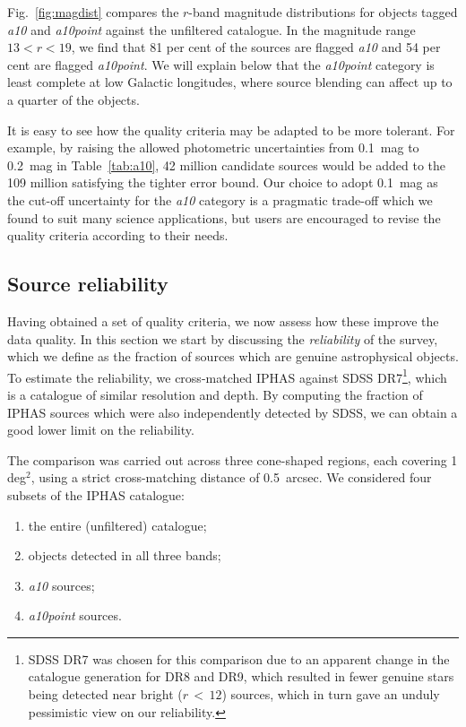 \documentclass[a4paper,useAMS,usenatbib]{mn2e}
\begin{document}
{Fig.~\ref{fig:magdist} compares the $r$-band magnitude
distributions for objects tagged \emph{a10} and \emph{a10point}
against the unfiltered catalogue.
In the magnitude range $13 < r < 19$,
we find that 81 per cent of the sources 
are flagged \emph{a10}
and 54 per cent are flagged \emph{a10point}.
We will explain below that the
\emph{a10point} category is least complete
at low Galactic longitudes,
where source blending can affect
up to a quarter of the objects.

It is easy to see how the quality criteria
may be adapted to be more tolerant.
For example, by raising the allowed photometric uncertainties
from 0.1~mag to 0.2~mag in Table~\ref{tab:a10},
42 million candidate sources would be added to the 109 
million satisfying the tighter error bound.
Our choice to adopt 0.1~mag as the cut-off uncertainty
for the \emph{a10} category is a pragmatic trade-off
which we found to suit many science applications,
but users are encouraged 
to revise the quality criteria according to their needs.


\subsection{Source reliability}
\label{sec:reliability}

Having obtained a set of quality criteria,
we now assess how these improve the data quality.
In this section we start by discussing
the \emph{reliability} of the survey,
which we define as the fraction of sources
which are genuine astrophysical objects.
To estimate the reliability, we cross-matched IPHAS
against SDSS DR7\footnote{SDSS DR7 was chosen for this comparison
due to an apparent change in 
the catalogue generation for DR8 and DR9,
which resulted in fewer genuine stars being
detected near bright ($r\,<\,12$) sources,
which in turn gave an unduly pessimistic view
on our reliability.},
which is a catalogue of similar resolution and depth.
By computing the fraction of IPHAS sources which were
also independently detected by SDSS,
we can obtain a good lower limit on the reliability.


The comparison was carried out across three cone-shaped regions,
each covering 1 deg$^2$,
using a strict cross-matching distance of 0.5~arcsec.
We considered four subsets of the IPHAS catalogue:
\begin{enumerate}
\item the entire (unfiltered) catalogue;
\item objects detected in all three bands;
\item \emph{a10} sources;
\item \emph{a10point} sources.
\end{enumerate}

}
\end{document}
